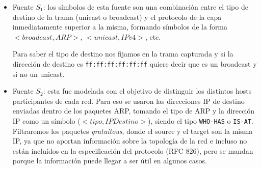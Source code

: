 \begin{itemize}

  \item Fuente $S_1$: los símbolos de esta fuente son una combinación entre el tipo de destino de la trama (unicast o broadcast) y el protocolo de la capa inmediatamente superior a la misma, formando símbolos de la forma $<broadcast, ARP>$, $<unicast, IPv4>$, etc.
  
  Para saber el tipo de destino nos fijamos en la trama capturada y si la dirección de destino es \texttt{ff:ff:ff:ff:ff:ff} quiere decir que es un broadcast y si no un unicast.
  
  \item Fuente $S_2$: esta fue modelada con el objetivo de distinguir los distintos hosts participantes de cada red. Para eso se usaron las direcciones IP de destino enviadas dentro de los paquetes ARP, tomando el tipo de ARP y la dirección IP  como un símbolo ($<tipo, IPDestino>$), siendo el tipo \texttt{WHO-HAS} o \texttt{IS-AT}. Filtraremos los paquetes \textit{gratuitous}, donde el source y el target son la misma IP, ya que no aportan información sobre la topología de la red e incluso no están incluídos en la especificación del protocolo (RFC 826), pero se mandan porque la información puede llegar a ser útil en algunos casos.

\end{itemize}

